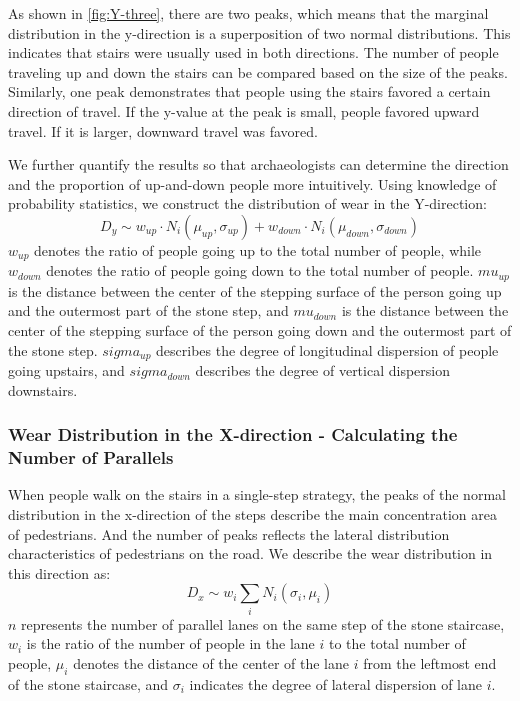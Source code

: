 \documentclass[12pt]{article}  %
\numberwithin{equation}{section} %
\begin{document}
As shown in \autoref{fig:Y-three},  there are two peaks, which means that the marginal distribution in the y-direction is a superposition of two normal distributions. This indicates that stairs were usually used in both directions. The number of people traveling up and down the stairs can be compared based on the size of the peaks. Similarly, one peak demonstrates that people using the stairs favored a certain direction of travel. If the y-value at the peak is small, people favored upward travel. If it is larger, downward travel was favored.


We further quantify the results so that archaeologists can determine the direction and the proportion of up-and-down people more intuitively. Using knowledge of probability statistics, we construct the distribution of wear in the Y-direction:
\begin{equation}
D_{y}\sim w_{up}\cdot N_i(\mu_{up},\sigma_{up})+w_{down}\cdot N_i(\mu_{down},\sigma_{down})
\end{equation}
$w_{up}$ denotes the ratio of people going up to the total number of people, while $w_{down}$ denotes the ratio of people going down to the total number of people. $mu_{up}$ is the distance between the center of the stepping surface of the person going up and the outermost part of the stone step, and $mu_{down}$ is the distance between the center of the stepping surface of the person going down and the outermost part of the stone step. $sigma_{up}$ describes the degree of longitudinal dispersion of people going upstairs, and $sigma_{down}$ describes the degree of vertical dispersion downstairs. 
\subsubsection{Wear Distribution in the X-direction - Calculating the Number of Parallels}
When people walk on the stairs in a single-step strategy, the peaks of the normal distribution in the x-direction of the steps describe the main concentration area of pedestrians. And the number of peaks reflects the lateral distribution characteristics of pedestrians on the road. We describe the wear distribution in this direction as:
\begin{equation}
    D_{x}\sim w_i\sum_{i}N_i(\sigma_i,\mu_i)
\end{equation}
$n$ represents the number of parallel lanes on the same step of the stone staircase, $w_i$ is the ratio of the number of people in the lane $i$ to the total number of people,  $\mu_i$ denotes the distance of the center of the lane $i$ from the leftmost end of the stone staircase, and $\sigma_i$ indicates the degree of lateral dispersion of lane $i$.
\end{document}
